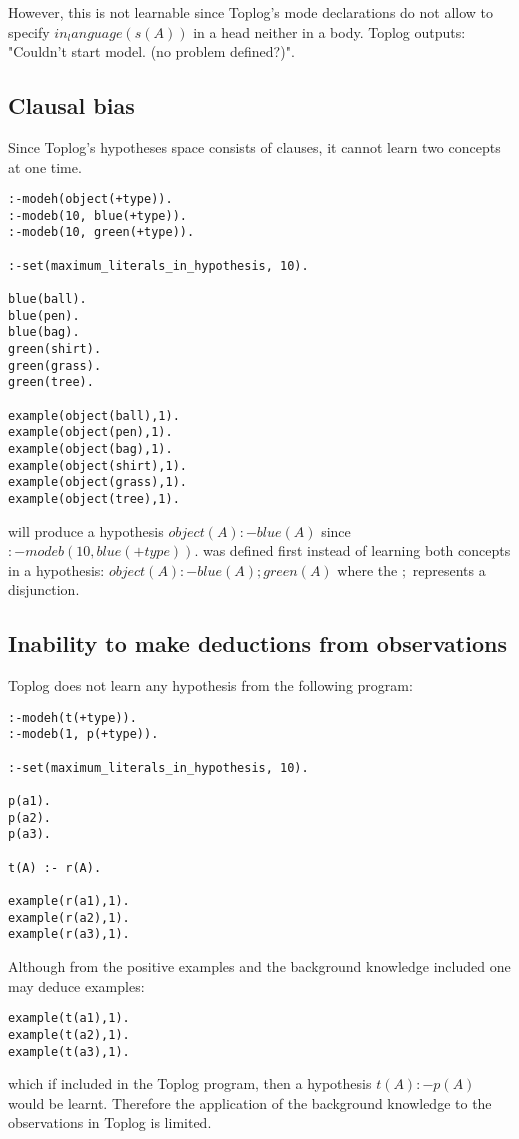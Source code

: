 However, this is not learnable since Toplog's mode declarations do not allow to specify $in_language(s(A))$ in a head neither in a body. Toplog outputs:
"Couldn't start model. (no problem defined?)".

\subsection{Clausal bias}
Since Toplog's hypotheses space consists of clauses, it cannot learn two concepts at one time.

\begin{lstlisting}
:-modeh(object(+type)).
:-modeb(10, blue(+type)).
:-modeb(10, green(+type)).

:-set(maximum_literals_in_hypothesis, 10).

blue(ball).
blue(pen).
blue(bag).
green(shirt).
green(grass).
green(tree).

example(object(ball),1).
example(object(pen),1).
example(object(bag),1).
example(object(shirt),1).
example(object(grass),1).
example(object(tree),1).
\end{lstlisting}

will produce a hypothesis $object(A) :- blue(A)$ since 
$:-modeb(10, blue(+type)).$ was defined first instead of learning both
concepts in a hypothesis:
$object(A) :- blue(A); green(A)$ where the $;$ represents a disjunction.

\subsection{Inability to make deductions from observations}
Toplog does not learn any hypothesis from the following program:

\begin{lstlisting}
:-modeh(t(+type)).
:-modeb(1, p(+type)).

:-set(maximum_literals_in_hypothesis, 10).

p(a1).
p(a2).
p(a3).

t(A) :- r(A).

example(r(a1),1).
example(r(a2),1).
example(r(a3),1).
\end{lstlisting}
Although from the positive examples and the background knowledge included one may deduce examples:
\begin{lstlisting}
example(t(a1),1).
example(t(a2),1).
example(t(a3),1).
\end{lstlisting}
which if included in the Toplog program, then a hypothesis
$t(A) :- p(A)$ would be learnt.
Therefore the application of the background knowledge to the observations in Toplog is limited.


